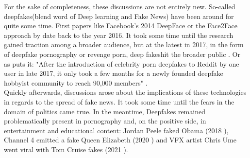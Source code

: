 \documentclass[
  a4paper,  %
  twoside,  %
  bibliography=totoc,
  headsepline,
  cleardoublepage=empty,
  parskip=half,
  draft=false
]{scrbook}
\begin{document}
For the sake of completeness, these discussions are not entirely new. So-called deepfakes(blend word of Deep learning and Fake News) have been around for quite some time. First papers like Facebook's 2014 DeepFace \cite{taigmanDeepFaceClosingGap2014} or the Face2Face approach by \citet{thiesFace2FaceRealtimeFace2020} date back to the year 2016. It took some time until the research gained traction among a broader audience, but at the latest in 2017, in the form of deepfake pornography or revenge porn, deep fakeshit the broader public \cite{coleAIAssistedFakePorn2017}. Or as \citeauthor{westerlundEmergenceDeepfakeTechnology2019a} puts it: "After the introduction of celebrity porn deepfakes to Reddit by one user in late 2017, it only took a few months for a newly founded deepfake hobbyist community to reach 90,000 members" \cite{westerlundEmergenceDeepfakeTechnology2019a}. \\
Quickly afterwards, discussions arose about the implications of these technologies in regards to the spread of fake news. It took some time until the fears in the domain of politics came true. In the meantime, Deepfakes remained problematically present in pornography and, on the positive side, in entertainment and educational content: Jordan Peele faked Obama (2018 \cite{vincentWatchJordanPeele2018}), Channel 4 emitted a fake Queen Elizabeth (2020 \cite{DeepfakeQueenDeliver2020}) and VFX artist Chris Ume went viral with Tom Cruise fakes (2021 \cite{vincentTomCruiseDeepfake2021}).
\end{document}
